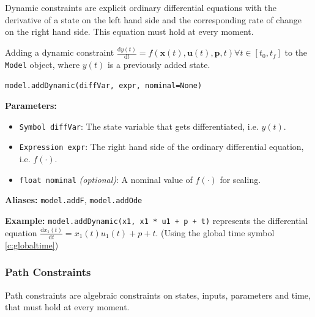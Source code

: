 \documentclass[12pt]{article}
\newcommand{\dd}{\mathrm{d}}
\renewcommand{\v}{\bm}
\begin{document}
	Dynamic constraints are explicit ordinary differential equations with the derivative of a state on the left hand side and the corresponding rate of change on the right hand side. This equation must hold at every moment.
	
	\begin{mdframed}[backgroundcolor=gray!10, roundcorner=10pt, linewidth=1pt]
		
		Adding a dynamic constraint $\frac{\dd y(t)}{\dd t} = f(\v{x}(t), \v{u}(t), \v{p}, t) \forall t \in [t_0, t_f]$ to the \texttt{Model} object, where $y(t)$ is a previously added state.
		
		\begin{lstlisting}
model.addDynamic(diffVar, expr, nominal=None)
		\end{lstlisting}
		\label{addDynamic}
		\textbf{Parameters:}
		\begin{itemize}
			\item \texttt{Symbol diffVar}: The state variable that gets differentiated, i.e. $y(t)$.
			\item \texttt{Expression expr}: The right hand side of the ordinary differential equation, i.e. $f(\cdot)$.
			\item \texttt{float nominal} \emph{(optional)}: A nominal value of $f(\cdot)$ for scaling.
		\end{itemize}

		\textbf{Aliases:}  \texttt{model.addF}, \texttt{model.addOde}
		
		\textbf{Example:} \texttt{model.addDynamic(x1, x1 * u1 + p + t)} represents the differential equation
		$\frac{\dd x_1(t)}{\dd t} = x_1(t) u_1(t) + p + t$. (Using the global time symbol \ref{c:globaltime})
	\end{mdframed}
	
	\subsubsection{Path Constraints}
	
	Path constraints are algebraic constraints on states, inputs, parameters and time, that must hold at every moment. 
	
\end{document}
